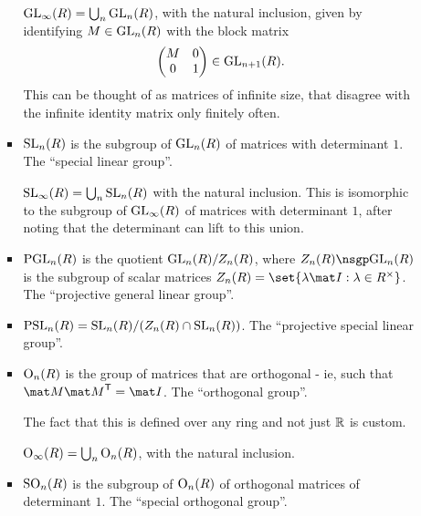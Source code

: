 \documentclass[a4paper,12pt]{article}
\begin{document}
\begin{enumerate}[leftmargin=*]
\begin{itemize}
\begin{itemize}
      \(\mathrm{GL}_\infty(R) = \bigcup_n \mathrm{GL}_n(R)\), with the natural
      inclusion, given by identifying \(M \in \mathrm{GL}_n(R)\) with the block matrix
      \begin{equation*}
       \begin{pmatrix}
        M & 0 \\
        0 & 1 \\
       \end{pmatrix} \in \mathrm{GL}_{n + 1}(R).
      \end{equation*}
      This can be thought of as matrices of infinite size, that disagree with
      the infinite identity matrix only finitely often.
     \item
      \(\mathrm{SL}_n(R)\) is the subgroup of \(\mathrm{GL}_n(R)\) of matrices
      with determinant \(1\). The ``special linear group''.

      \(\mathrm{SL}_\infty(R) = \bigcup_n \mathrm{SL}_n(R)\) with the natural
      inclusion. This is isomorphic to the subgroup of
      \(\mathrm{GL}_\infty(R)\) of matrices with determinant \(1\), after
      noting that the determinant can lift to this union.
     \item
      \(\mathrm{PGL}_n(R)\) is the quotient
      \(\mathrm{GL}_n(R) / Z_n(R)\), where \(Z_n(R) \nsgp \GL_n(R)\) is the
      subgroup of scalar matrices
      \(Z_n(R) = \set{\lambda \mat I: \lambda \in R^\times}\).
      The ``projective general linear group''.


     \item
      \(\mathrm{PSL}_n(R) = \mathrm{SL}_n(R) / (Z_n(R) \cap \mathrm{SL}_n(R))\).
      The ``projective special linear group''.

     \item
      \(\mathrm{O}_n(R)\) is the group of matrices that are orthogonal -
      ie, such that \(\mat M \tran{\mat M} = \mat I\).
      The ``orthogonal group''.

      The fact that this is defined over any ring and not just \(\mathbb R\) is custom.

      \(\mathrm{O}_\infty(R) = \bigcup_n \mathrm{O}_n(R)\), with the natural inclusion.
     \item
      \(\mathrm{SO}_n(R)\) is the subgroup of \(\mathrm{O}_n(R)\) of orthogonal matrices of
      determinant \(1\). The ``special orthogonal group''.


\end{itemize}
\end{itemize}
\end{enumerate}
\end{document}
